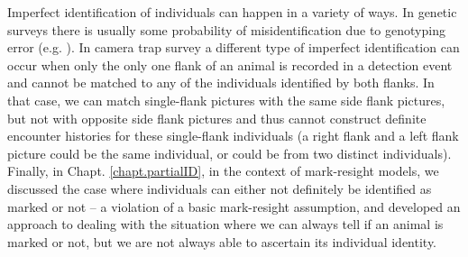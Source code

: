 Imperfect identification of individuals can happen in a variety of
ways. In genetic surveys there is usually some probability of
misidentification %
due to genotyping error
(e.g. \citet{lukacs_burnham:2005}). In camera trap survey a different
type of imperfect identification can occur when only the only one
flank of an animal is recorded in a detection event and %
cannot be matched to any of the individuals identified by both
flanks.
In that case, we can match single-flank pictures with the same
side flank pictures, but not with opposite side flank pictures and
thus cannot construct definite encounter histories for these
single-flank individuals (a right flank and a left flank picture could
be the same individual, or could be from two distinct
individuals). Finally, in Chapt. \ref{chapt.partialID}, in the context
of mark-resight models, we discussed the case where individuals can
either not definitely be identified as marked or not -- a violation of
a basic mark-resight assumption, and developed an approach to dealing
with the situation where we can always tell if an animal is marked or
not, but we are not always able to ascertain its individual identity.

